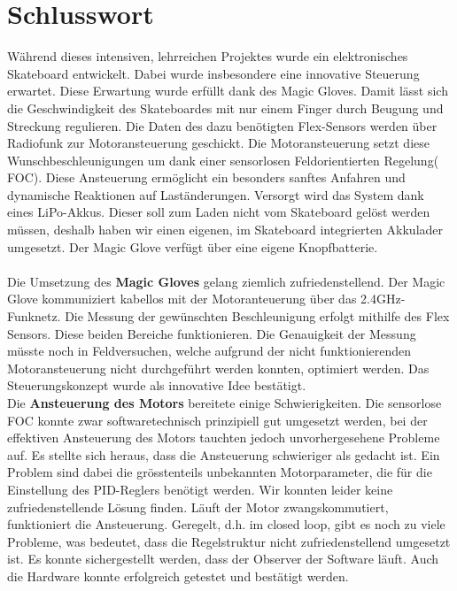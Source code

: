 \chapter{Schlusswort}

Während dieses intensiven, lehrreichen Projektes wurde ein elektronisches Skateboard entwickelt. Dabei wurde insbesondere eine innovative Steuerung erwartet. Diese Erwartung wurde erfüllt dank des Magic Gloves. Damit lässt sich die Geschwindigkeit des Skateboardes mit nur einem Finger durch Beugung und Streckung regulieren. Die Daten des dazu benötigten Flex-Sensors werden über Radiofunk zur Motoransteuerung geschickt. Die Motoransteuerung setzt diese Wunschbeschleunigungen um dank einer sensorlosen Feldorientierten Regelung( FOC). Diese Ansteuerung ermöglicht ein besonders sanftes Anfahren und dynamische Reaktionen auf Laständerungen. Versorgt wird das System dank eines LiPo-Akkus. Dieser soll zum Laden nicht vom Skateboard gelöst werden müssen, deshalb haben wir einen eigenen, im Skateboard integrierten Akkulader umgesetzt. Der Magic Glove verfügt über eine eigene Knopfbatterie.\\
\\
Die Umsetzung des \textbf{Magic Gloves} gelang ziemlich zufriedenstellend. Der Magic Glove kommuniziert kabellos mit der Motoranteuerung über das 2.4GHz-Funknetz. Die Messung der gewünschten Beschleunigung erfolgt mithilfe des Flex Sensors. Diese beiden Bereiche funktionieren. Die Genauigkeit der Messung müsste noch in Feldversuchen, welche aufgrund der nicht funktionierenden Motoransteuerung nicht durchgeführt werden konnten, optimiert werden. Das Steuerungskonzept wurde als innovative Idee bestätigt. \\
Die \textbf{Ansteuerung des Motors} bereitete einige Schwierigkeiten. Die sensorlose FOC konnte zwar softwaretechnisch prinzipiell gut umgesetzt werden, bei der effektiven Ansteuerung des Motors tauchten jedoch unvorhergesehene Probleme auf. Es stellte sich heraus, dass die Ansteuerung schwieriger als gedacht ist. Ein Problem sind dabei die grösstenteils unbekannten Motorparameter, die für die Einstellung des PID-Reglers benötigt werden. Wir konnten leider keine zufriedenstellende Lösung finden. Läuft der Motor zwangskommutiert, funktioniert die Ansteuerung. Geregelt, d.h. im closed loop, gibt es noch zu viele Probleme, was bedeutet, dass die Regelstruktur nicht zufriedenstellend umgesetzt ist. Es konnte sichergestellt werden, dass der Observer der Software läuft. Auch die Hardware konnte erfolgreich getestet und bestätigt werden. \\
